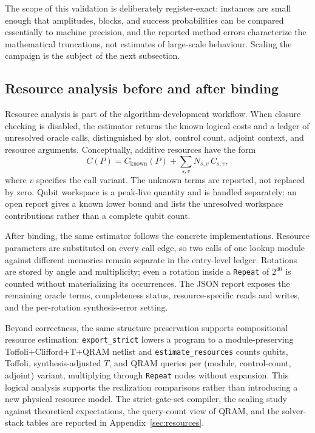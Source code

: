 The scope of this validation is deliberately register-exact: instances
are small enough that amplitudes, blocks, and success probabilities can be
compared essentially to machine precision, and the reported method errors
characterize the mathematical truncations, not estimates of large-scale
behaviour.  Scaling the campaign is the subject of the next subsection.

\subsection{Resource analysis before and after binding}
\label{sec:resources-summary}

Resource analysis is part of the algorithm-development workflow.
When closure checking is disabled, the estimator returns the known
logical costs and a ledger of unresolved oracle calls, distinguished by
slot, control count, adjoint context, and resource arguments.
Conceptually, additive resources have the form
\[
 C(P)=C_{\mathrm{known}}(P)+\sum_{s,v} N_{s,v}\,C_{s,v},
\]
where $v$ specifies the call variant. The unknown terms are reported,
not replaced by zero. Qubit workspace is a peak-live quantity and is
handled separately: an open report gives a known lower bound and lists
the unresolved workspace contributions rather than a complete qubit count.

After binding, the same estimator follows the concrete implementations.
Resource parameters are substituted on every call edge, so two calls of
one lookup module against different memories remain separate in the
entry-level ledger. Rotations are stored by angle and multiplicity;
even a rotation inside a \texttt{Repeat} of $2^{40}$ is counted without
materializing its occurrences. The JSON report exposes the remaining
oracle terms, completeness status, resource-specific reads and writes,
and the per-rotation synthesis-error setting.

Beyond correctness, the same structure preservation supports compositional
resource estimation: \texttt{export\_strict} lowers a program to a
module-preserving Toffoli+Clifford+T+QRAM netlist and
\texttt{estimate\_resources} counts qubits, Toffoli, synthesis-adjusted
$T$, and QRAM queries per (module, control-count, adjoint) variant,
multiplying through \texttt{Repeat} nodes without expansion. This logical
analysis supports the realization comparisons rather than introducing
a new physical resource model. The strict-gate-set compiler, the scaling study against theoretical
expectations, the query-count view of QRAM, and the solver-stack tables
are reported in Appendix~\ref{sec:resources}.

